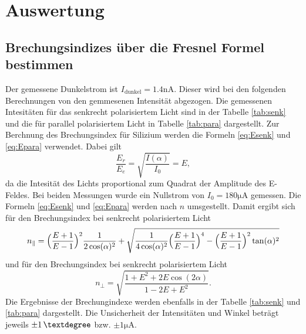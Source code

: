 \section{Auswertung}
\label{sec:Auswertung}

\subsection{Brechungsindizes über die Fresnel Formel bestimmen}
Der gemessene Dunkelstrom ist $I_\text{dunkel} = 1.4 \unit{\nano\ampere}$. Dieser wird bei den folgenden Berechnungen von den gemmesenen Intensität abgezogen.
Die gemessenen Intesitäten für das senkrecht polarisiertem Licht sind in der Tabelle \ref{tab:senk} und 
die für parallel polarisiertem Licht in Tabelle \ref{tab:para} dargestellt.
Zur Berchnung des Brechungsindex für Silizium werden die Formeln \ref{eq:Esenk} und \ref{eq:Epara} verwendet.
Dabei gilt 
\begin{equation*}
  \frac{E_r}{E_e} = \sqrt{\frac{I(\alpha)}{I_0}} = E,
\end{equation*}
da die Intesität des Lichts proportional zum Quadrat der Amplitude des E-Feldes.
Bei beiden Messungen wurde ein Nullstrom von $I_0 = 180 \unit{\micro\ampere}$ gemessen.
Die Formeln \ref{eq:Esenk} und \ref{eq:Epara} werden nach $n$ umsgestellt.
Damit ergibt sich für den Brechungsindex bei senkrecht polarisiertem Licht
\begin{equation}
  n_\parallel = \Bigl(\frac{E+1}{E-1}\Bigr)^2\frac{1}{2 \cos(\alpha)^2}+\sqrt{\frac{1}{4 \cos(\alpha)^2}\Bigl(\frac{E+1}{E-1}\Bigr)^4-\Bigl(\frac{E+1}{E-1}\Bigr)^2 \tan(\alpha)^2}
\end{equation}
und für den Brechungsindex bei senkrecht polarisiertem Licht
\begin{equation}
  n_\perp = \sqrt{\frac{1+ E^2+ 2 E \cos(2 \alpha)}{1- 2 E+ E^2}}.
\end{equation}
Die Ergebnisse der Brechungindexe werden ebenfalls in der Tabelle \ref{tab:senk} und \ref{tab:para} dargestellt.
Die Unsicherheit der Intensitäten und Winkel beträgt jeweils $\qty{\pm 1}{°}$ bzw. $\pm 1 \unit{\micro\ampere}$.
